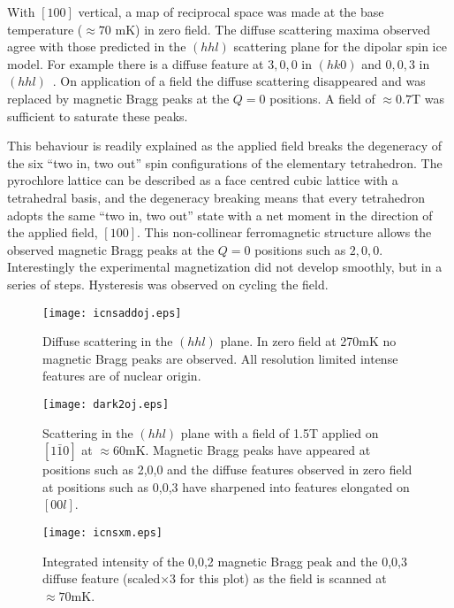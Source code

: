 \documentclass[global,twocolumn]{svjour}
\begin{document}
With $[100]$ vertical, a map of reciprocal space was made
at the base temperature ($\approx 70$ mK) in zero field. The diffuse 
scattering maxima observed agree with those predicted in the $(hhl)$ 
scattering plane for the dipolar spin ice model.  For example there is a 
diffuse feature at $3,0,0$ in $(hk0)$ and $0,0,3$ in $(hhl)$~\cite{newprl}. 
On application of a field the diffuse scattering
disappeared and was replaced by magnetic Bragg peaks at the $Q = 0$ 
positions.  A field of $\approx0.7$T was sufficient to saturate these peaks.
  
This behaviour is readily explained as the applied field breaks the 
degeneracy of the six ``two in, two out'' spin configurations of the
elementary tetrahedron. The pyrochlore lattice can be described as a face
centred cubic lattice with a tetrahedral basis, and the 
degeneracy breaking means that every tetrahedron
adopts the same ``two in, two out'' state
with a net moment in the direction of the applied field, $[100]$.  
This non-collinear ferromagnetic 
structure allows the observed magnetic Bragg peaks at the $Q = 0$  
positions such as $2,0,0$.  
Interestingly the experimental magnetization did not develop smoothly, but 
in a series of steps.
Hysteresis was observed on cycling the field.

\begin{figure}
\texttt{[image: icnsaddoj.eps]}
\caption{Diffuse scattering in the $(hhl)$ plane.  In zero field at 270mK no magnetic Bragg peaks are observed.  All resolution limited intense features are of nuclear origin.}
\label{add}
\end{figure}

\begin{figure}
\texttt{[image: dark2oj.eps]}
\caption{Scattering in the $(hhl)$ plane with a field of 1.5T applied on 
$[1\bar{1}0]$ at $\approx 60$mK.  Magnetic Bragg peaks have appeared at 
positions such as 2,0,0 and the diffuse features observed in zero field at 
positions such as 0,0,3 have sharpened into features elongated on
$[00l]$.}
\label{tiger}
\end{figure}

\begin{figure}
\texttt{[image: icnsxm.eps]}
\caption{Integrated intensity of the 0,0,2 magnetic Bragg peak and the 0,0,3 
diffuse feature (scaled$\times 3$ for this plot) as the field is scanned at $\approx 70$mK.}
\label{loop}
\end{figure}
\end{document}
